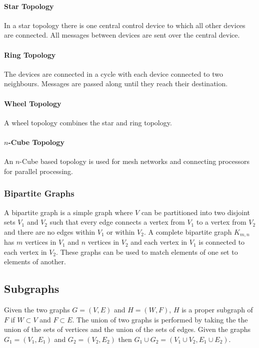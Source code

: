 \documentclass[a4paper, 10pt]{article}
\begin{document}
\paragraph{Star Topology}
In a star topology there is one central control device to which all other devices are connected. All messages between devices are sent over the central device.

\paragraph{Ring Topology}
The devices are connected in a cycle with each device connected to two neighbours. Messages are passed along until they reach their destination.

\paragraph{Wheel Topology}
A wheel topology combines the star and ring topology.

\paragraph{\(n\)-Cube Topology}
An \(n\)-Cube based topology is used for mesh networks and connecting processors for parallel processing.

\subsubsection{Bipartite Graphs}
A bipartite graph is a simple graph where \(V\) can be partitioned into two disjoint sets \(V_1\) and \(V_2\) such that every edge connects a vertex from \(V_1\) to a vertex from \(V_2\) and there are no edges within \(V_1\) or within \(V_2\). A complete bipartite graph \(K_{m,n}\) has \(m\) vertices in \(V_1\) and \(n\) vertices in \(V_2\) and each vertex in \(V_1\) is connected to each vertex in \(V_2\). These graphs can be used to match elements of one set to elements of another.

\subsection{Subgraphs}
Given the two graphs \(G=(V,E)\) and \(H=(W,F)\), \(H\) is a proper subgraph of \(F\) if \(W\subset V\) and \(F\subset E\). The union of two graphs is performed by taking the the union of the sets of vertices and the union of the sets of edges. Given the graphs \(G_1=(V_1,E_1)\) and \(G_2=(V_2, E_2)\) then \(G_1\cup G_2=(V_1\cup V_2, E_1\cup E_2)\).
\end{document}
